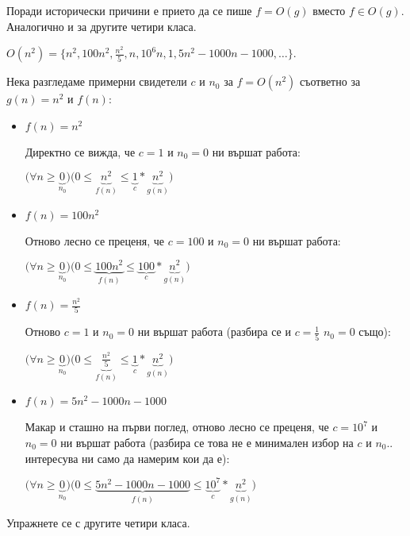 \begin{remark*}
	Поради исторически причини е прието да се пише $f=O(g)$ вместо $f\in O(g)$. Аналогично и за другите четири класа.
\end{remark*}\newpage

\begin{example}
	$O(n^2)=\{n^2,100n^2,\frac{n^2}5,n,{10}^6n,1,5n^2-1000n-1000,\dots\}$.

	\noindent
	Нека разгледаме примерни свидетели $c$ и $n_0$ за $f=O(n^2)$ съответно за $g(n)=n^2$ и $f(n)$:
	\begin{itemize}
		\item $f(n)=n^2$
		
		Директно се вижда, че $c=1$ и $n_0=0$ ни вършат работа:
		
		$\big(\forall n\ge\underbrace0_{n_0}\big)\big(0\le \underbrace{n^2}_{f(n)}\le\underbrace1_c*\underbrace{n^2}_{g(n)}\big)$
		\item $f(n)=100n^2$
		
		Отново лесно се преценя, че $c=100$ и $n_0=0$ ни вършат работа:
		
		$\big(\forall n\ge\underbrace0_{n_0}\big)\big(0\le \underbrace{100n^2}_{f(n)}\le\underbrace{100}_c*\underbrace{n^2}_{g(n)}\big)$
		
		\item $f(n)=\frac{n^2}5$
		
		Отново $c=1$ и $n_0=0$ ни вършат работа (разбира се и $c=\frac15$ $n_0=0$ също):
		
		$\big(\forall n\ge\underbrace0_{n_0}\big)\big(0\le \underbrace{\frac{n^2}5}_{f(n)}\le\underbrace1_c*\underbrace{n^2}_{g(n)}\big)$
		
		\item $f(n)=5n^2-1000n-1000$
		
		Макар и сташно на първи поглед, отново лесно се преценя, че $c={10}^7$ и $n_0=0$ ни вършат работа (разбира се това не е минимален избор на $c$ и $n_0$.. интересува ни само да намерим кои да е):
		
		$\big(\forall n\ge\underbrace0_{n_0}\big)\big(0\le \underbrace{5n^2-1000n-1000}_{f(n)}\le\underbrace{{10}^7}_c*\underbrace{n^2}_{g(n)}\big)$
	\end{itemize}
\end{example}

\noindent
Упражнете се с другите четири класа.

